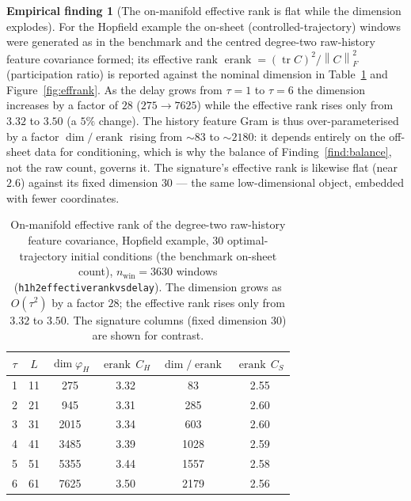 \documentclass[11pt]{article}
\renewcommand{\_}{\discretionary{\textunderscore}{}{\textunderscore}}
\theoremstyle{plain}
\theoremstyle{definition}
\newtheorem{finding}[theorem]{Empirical finding}
\newcommand{\effrank}{\operatorname{erank}}
\newcommand{\tr}{\operatorname{tr}}
\newcommand{\norm}[1]{\left\lVert #1 \right\rVert}
\begin{document}
\begin{finding}[The on-manifold effective rank is flat while the dimension explodes]\label{find:effrank}
For the Hopfield example the on-sheet (controlled-trajectory) windows were generated as in the
benchmark and the centred degree-two raw-history feature covariance formed; its effective rank
$\effrank=(\tr C)^{2}/\norm{C}_{F}^{2}$ (participation ratio) is reported against the nominal
dimension in Table~\ref{tab:effrank} and Figure~\ref{fig:effrank}. As the delay grows from
$\tau=1$ to $\tau=6$ the dimension increases by a factor of $28$ ($275\to7625$) while the
effective rank rises only from $3.32$ to $3.50$ (a $5\%$ change). The history feature Gram is
thus over-parameterised by a factor $\dim/\effrank$ rising from ${\sim}83$ to ${\sim}2180$: it
depends entirely on the off-sheet data for conditioning, which is why the balance of
Finding~\ref{find:balance}, not the raw count, governs it. The signature's effective rank is
likewise flat (near $2.6$) against its fixed dimension $30$ --- the same low-dimensional object,
embedded with fewer coordinates.
\end{finding}

\begin{table}[ht]\centering\small
\caption{On-manifold effective rank of the degree-two raw-history feature covariance, Hopfield
example, $30$ optimal-trajectory initial conditions (the benchmark on-sheet count),
$n_{\text{win}}=3630$ windows (\texttt{h1h2\_effective\_rank\_vs\_delay}). The dimension grows as
$O(\tau^{2})$ by a factor $28$; the effective rank rises only from $3.32$ to $3.50$. The
signature columns (fixed dimension $30$) are shown for contrast.}
\label{tab:effrank}
\setlength{\tabcolsep}{6pt}
\begin{tabular}{ccccc c}
\toprule
$\tau$ & $L$ & $\dim\varphi_H$ & $\effrank\,C_H$ & $\dim/\effrank$ & $\effrank\,C_S$\\
\midrule
1 & 11 & 275  & 3.32 & 83   & 2.55\\
2 & 21 & 945  & 3.31 & 285  & 2.60\\
3 & 31 & 2015 & 3.34 & 603  & 2.60\\
4 & 41 & 3485 & 3.39 & 1028 & 2.59\\
5 & 51 & 5355 & 3.44 & 1557 & 2.58\\
6 & 61 & 7625 & 3.50 & 2179 & 2.56\\
\bottomrule
\end{tabular}
\end{table}
\end{document}
